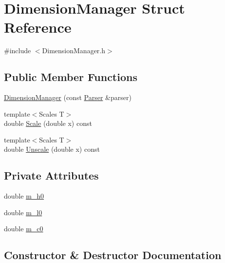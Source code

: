 \hypertarget{structDimensionManager}{}\section{Dimension\+Manager Struct Reference}
\label{structDimensionManager}


{\ttfamily \#include $<$Dimension\+Manager.\+h$>$}

\subsection*{Public Member Functions}
\begin{DoxyCompactItemize}
\item 
\hyperlink{structDimensionManager_a3e8a02165bb4399304ee495196b32509}{Dimension\+Manager} (const \hyperlink{structParser}{Parser} \&parser)
\item 
{\footnotesize template$<$Scales T$>$ }\\double \hyperlink{structDimensionManager_ad7fac9ebd57da5ade091bfe0eef2c7f2}{Scale} (double x) const
\item 
{\footnotesize template$<$Scales T$>$ }\\double \hyperlink{structDimensionManager_ab178f6b5cdd976d1c51dcb6057e205a9}{Unscale} (double x) const
\end{DoxyCompactItemize}
\subsection*{Private Attributes}
\begin{DoxyCompactItemize}
\item 
double \hyperlink{structDimensionManager_a322d75493bbd3704678802fcd2d04589}{m\+\_\+h0}
\item 
double \hyperlink{structDimensionManager_a70bdbf26e8f750e6073afd3b121b92bd}{m\+\_\+l0}
\item 
double \hyperlink{structDimensionManager_a52b7e7e95a10a22681d6489013e37f09}{m\+\_\+c0}
\end{DoxyCompactItemize}


\subsection{Constructor \& Destructor Documentation}
\mbox{\label{structDimensionManager_a3e8a02165bb4399304ee495196b32509}} 
